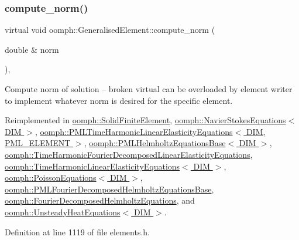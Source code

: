 \subsubsection{\texorpdfstring{compute\+\_\+norm()}{compute\_norm()}}
{\footnotesize\ttfamily virtual void oomph\+::\+Generalised\+Element\+::compute\+\_\+norm (\begin{DoxyParamCaption}\item[{double \&}]{norm }\end{DoxyParamCaption})\hspace{0.3cm}{\ttfamily [inline]}, {\ttfamily [virtual]}}



Compute norm of solution -- broken virtual can be overloaded by element writer to implement whatever norm is desired for the specific element. 



Reimplemented in \hyperlink{classoomph_1_1SolidFiniteElement_ace4b1be200ce47b16ec15d429c08a80e}{oomph\+::\+Solid\+Finite\+Element}, \hyperlink{classoomph_1_1NavierStokesEquations_a929b419d4927aafeee72de9d5da9e595}{oomph\+::\+Navier\+Stokes\+Equations$<$ D\+I\+M $>$}, \hyperlink{classoomph_1_1PMLTimeHarmonicLinearElasticityEquations_af71b0560271b3e27c74b39f6b247fc81}{oomph\+::\+P\+M\+L\+Time\+Harmonic\+Linear\+Elasticity\+Equations$<$ D\+I\+M, P\+M\+L\+\_\+\+E\+L\+E\+M\+E\+N\+T $>$}, \hyperlink{classoomph_1_1PMLHelmholtzEquationsBase_ae426e5240fc08c0bee0f34862b22b286}{oomph\+::\+P\+M\+L\+Helmholtz\+Equations\+Base$<$ D\+I\+M $>$}, \hyperlink{classoomph_1_1TimeHarmonicFourierDecomposedLinearElasticityEquations_a5dc79c23b17db6bf138f757859e2b53e}{oomph\+::\+Time\+Harmonic\+Fourier\+Decomposed\+Linear\+Elasticity\+Equations}, \hyperlink{classoomph_1_1TimeHarmonicLinearElasticityEquations_a50a5236dcb29a7547a7e2fd75bf96b7f}{oomph\+::\+Time\+Harmonic\+Linear\+Elasticity\+Equations$<$ D\+I\+M $>$}, \hyperlink{classoomph_1_1PoissonEquations_a44cc8368f1e4008997908134300ab13f}{oomph\+::\+Poisson\+Equations$<$ D\+I\+M $>$}, \hyperlink{classoomph_1_1PMLFourierDecomposedHelmholtzEquationsBase_a74c7136878535e68ba828d9c55b74173}{oomph\+::\+P\+M\+L\+Fourier\+Decomposed\+Helmholtz\+Equations\+Base}, \hyperlink{classoomph_1_1FourierDecomposedHelmholtzEquations_a8139e48ff406de0f7b2c76d007b9e7e3}{oomph\+::\+Fourier\+Decomposed\+Helmholtz\+Equations}, and \hyperlink{classoomph_1_1UnsteadyHeatEquations_a0b5413cd78f410efd7ab3273a34cca5f}{oomph\+::\+Unsteady\+Heat\+Equations$<$ D\+I\+M $>$}.



Definition at line 1119 of file elements.\+h.



